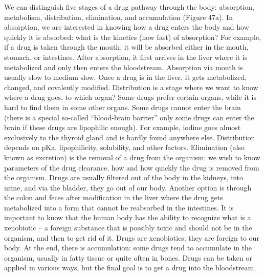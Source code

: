 \documentclass[dvipsnames, svgnames,a4paper,11pt]{article}
\begin{document}
We can distinguish five stages of a drug pathway through the body: absorption, metabolism, distribution, elimination, and accumulation (Figure 47a). In absorption, we are interested in knowing how a drug enters the body and how quickly it is absorbed: what is the kinetics (how fast) of absorption? For example, if a drug is taken through the mouth, it will be absorbed either in the mouth, stomach, or intestines. After absorption, it first arrives in the liver where it is metabolized and only then enters the bloodstream. Absorption via mouth is usually slow to medium slow. Once a drug is in the liver, it gets metabolized, changed, and covalently modified. Distribution is a stage where we want to know where a drug goes, to which organ? Some drugs prefer certain organs, while it is hard to find them in some other organs. Some drugs cannot enter the brain (there is a special so-called “blood-brain barrier” only some drugs can enter the brain if these drugs are lipophilic enough). For example, iodine goes almost exclusively to the thyroid gland and is hardly found anywhere else. Distribution depends on pKa, lipophilicity, solubility, and other factors. Elimination (also known as excretion) is the removal of a drug from the organism: we wish to know parameters of the drug clearance, how and how quickly the drug is removed from the organism. Drugs are usually filtered out of the body in the kidneys, into urine, and via the bladder, they go out of our body. Another option is through the colon and feces after modification in the liver where the drug gets metabolized into a form that cannot be reabsorbed in the intestines. It is important to know that the human body has the ability to recognize what is a xenobiotic – a foreign substance that is possibly toxic and should not be in the organism, and then to get rid of it. Drugs are xenobiotics; they are foreign to our body. At the end, there is accumulation: some drugs tend to accumulate in the organism, usually in fatty tissue or quite often in bones. Drugs can be taken or applied in various ways, but the final goal is to get a drug into the bloodstream.  
\end{document}
